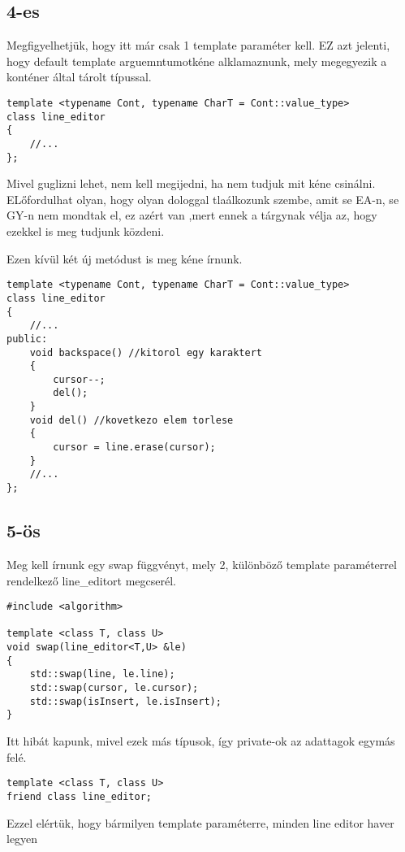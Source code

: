 \documentclass[a4paper,11.5pt]{article}
\begin{document}
	\subsection{4-es}
	Megfigyelhetjük, hogy itt már csak 1 template paraméter kell. EZ azt jelenti, hogy default template arguemntumotkéne alklamaznunk, mely megegyezik a konténer által tárolt típussal.
\begin{lstlisting}
template <typename Cont, typename CharT = Cont::value_type>
class line_editor
{
	//...
};
\end{lstlisting}
	 Mivel guglizni lehet, nem kell megijedni, ha nem tudjuk mit kéne csinálni. ELőfordulhat olyan, hogy olyan dologgal tlaálkozunk szembe, amit se EA-n, se GY-n nem mondtak el, ez azért van ,mert ennek a tárgynak vélja az, hogy ezekkel is meg tudjunk közdeni.
	 
	Ezen kívül két új metódust is meg kéne írnunk.
\begin{lstlisting}
template <typename Cont, typename CharT = Cont::value_type>
class line_editor
{
	//...
public:	
	void backspace() //kitorol egy karaktert
	{
		cursor--;
		del();
	}
	void del() //kovetkezo elem torlese
	{
		cursor = line.erase(cursor);
	}
	//...
};
\end{lstlisting}
	\subsection{5-ös}
	Meg kell írnunk egy swap függvényt, mely 2, különböző template paraméterrel rendelkező line\_editort megcserél.
	\begin{lstlisting}
#include <algorithm>
	
template <class T, class U>
void swap(line_editor<T,U> &le)
{
	std::swap(line, le.line);
	std::swap(cursor, le.cursor);
	std::swap(isInsert, le.isInsert);
}
	\end{lstlisting}
	Itt hibát kapunk, mivel ezek más típusok, így private-ok az adattagok egymás felé.
	\begin{lstlisting}
template <class T, class U>
friend class line_editor;
	\end{lstlisting}
	Ezzel elértük, hogy bármilyen template paraméterre, minden line editor haver legyen
\end{document}

